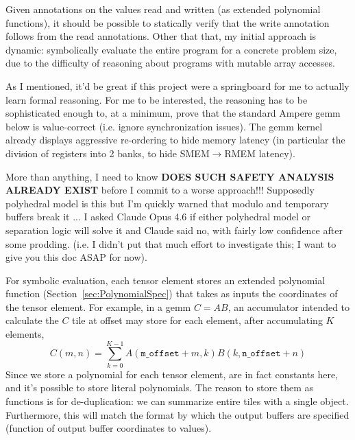 
Given annotations on the values read and written (as extended polynomial functions), it should be possible to statically verify that the write annotation follows from the read annotations.
Other that that, my initial approach is dynamic: symbolically evaluate the entire program for a concrete problem size, due to the difficulty of reasoning about programs with mutable array accesses.

As I mentioned, it'd be great if this project were a springboard for me to actually learn formal reasoning.
For me to be interested, the reasoning has to be sophisticated enough to, at a minimum, prove that the standard Ampere gemm below is value-correct (i.e. ignore synchronization issues).
The gemm kernel already displays aggressive re-ordering to hide memory latency (in particular the division of registers into 2 banks, to hide SMEM$\to$RMEM latency).

\begin{samepage}
{\small



}
\end{samepage}

\textbf{} More than anything, I need to know \textbf{DOES SUCH SAFETY ANALYSIS ALREADY EXIST} before I commit to a worse approach!!!
Supposedly polyhedral model is this but I'm quickly warned that modulo and temporary buffers break it ... I asked Claude Opus 4.6 if either polyhedral model or separation logic will solve it and Claude said no, with fairly low confidence after some prodding.
(i.e. I didn't put that much effort to investigate this; I want to give you this doc ASAP for now).


For symbolic evaluation, each tensor element stores an extended polynomial function (Section~\ref{sec:PolynomialSpec}) that takes as inputs the coordinates of the tensor element.
For example, in a gemm $C = AB$, an accumulator  intended to calculate the $C$ tile at offset  may store for each element, after accumulating $K$ elements,
\begin{equation*}
    C(m, n) = \sum_{k=0}^{K-1} A(\texttt{m\_offset} + m, k) B(k, \texttt{n\_offset} + n)
\end{equation*}
Since we store a polynomial for each tensor element,  are in fact constants here, and it's possible to store literal polynomials.
The reason to store them as functions is for de-duplication: we can summarize entire tiles with a single object.
Furthermore, this will match the format by which the output buffers are specified (function of output buffer coordinates to values).

